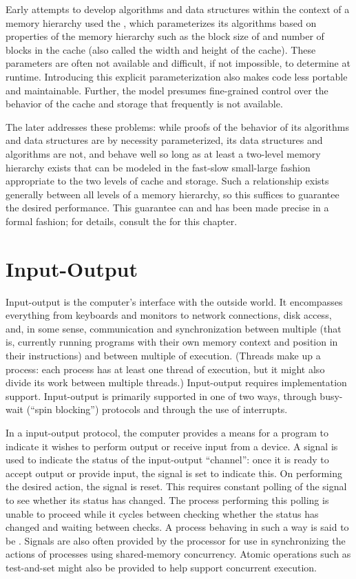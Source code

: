 Early attempts to develop algorithms and data structures within the context of a memory hierarchy used the , which parameterizes its algorithms based on properties of the memory hierarchy such as the block size of and number of blocks in the cache (also called the width and height of the cache). These parameters are often not available and difficult, if not impossible, to determine at runtime. Introducing this explicit parameterization also makes code less portable and maintainable. Further, the model presumes fine-grained control over the behavior of the cache and storage that frequently is not available.

The later  addresses these problems: while proofs of the behavior of its algorithms and data structures are by necessity parameterized, its data structures and algorithms are not, and behave well so long as at least a two-level memory hierarchy exists that can be modeled in the fast-slow small-large fashion appropriate to the two levels of cache and storage. Such a relationship exists generally between all levels of a memory hierarchy, so this suffices to guarantee the desired performance. This guarantee can and has been made precise in a formal fashion; for details, consult the  for this chapter.

\section{Input-Output}\label{background:computers:inputoutput}
Input-output is the computer's interface with the outside world. It encompasses everything from keyboards and monitors to network connections, disk access, and, in some sense, communication and synchronization between multiple  (that is, currently running programs with their own memory context and position in their instructions) and between multiple  of execution. (Threads make up a process: each process has at least one thread of execution, but it might also divide its work between multiple threads.) Input-output requires implementation support. Input-output is primarily supported in one of two ways, through busy-wait (``spin blocking'') protocols and through the use of interrupts.

In a  input-output protocol, the computer provides a means for a program to indicate it wishes to perform output or receive input from a device. A signal is used to indicate the status of the input-output ``channel'': once it is ready to accept output or provide input, the signal is set to indicate this. On performing the desired action, the signal is reset. This requires constant polling of the signal to see whether its status has changed. The process performing this polling is unable to proceed while it cycles between checking whether the status has changed and waiting between checks. A process behaving in such a way is said to be . Signals are also often provided by the processor for use in synchronizing the actions of processes using shared-memory concurrency. Atomic operations such as test-and-set might also be provided to help support concurrent execution.

